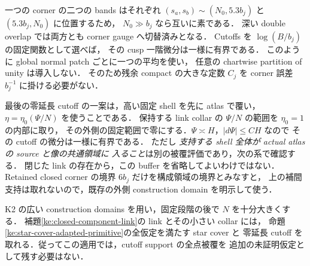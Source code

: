 一つの corner の二つの bands はそれぞれ
$(s_a,s_b)\sim(N_0,5.3b_j)$ と $(5.3b_j,N_0)$ に位置するため，
$N_0\gg b_j$ なら互いに素である．
深い double overlap では両方とも corner gauge へ切替済みとなる．
Cutoffs を $\log(B/b_j)$ の固定関数として選べば，
その cusp 一階微分は一様に有界である．
このように global normal patch ごとに一つの平均を使い，
任意の chartwise partition of unity は導入しない．
そのため残余 compact の大きな定数 $C_j$ を corner 誤差 $b_j^{-1}$ に掛ける必要がない．

最後の零延長 cutoff の一案は，高い固定 shell を先に atlas で覆い，
$\eta=\eta_0(\Psi/N)$ を使うことである．
保持する link collar の $\Psi/N$ の範囲を $\eta_0=1$ の内部に取り，
その外側の固定範囲で零にする．$\Psi\asymp H$，$|d\Psi|\le CH$ なので
その cutoff の微分は一様に有界である．
ただし \emph{支持する shell 全体が actual atlas の source と像の共通領域に
入ること}は別の被覆評価であり，次の系で確認する．
閉じた link の存在から，この buffer を省略してよいわけではない．
Retained closed corner の境界 $6b_j$ だけを構成領域の境界とみなすと，
上の補間支持は取れないので，既存の外側 construction domain を明示して使う．

\begin{corollary}
\label{ke:component-shell-primitive-support}
K2 の広い construction domains を用い，固定段階の後で $N$ を十分大きくする．
補題\ref{ke:closed-component-link}の link とその小さい collar には，
命題\ref{ke:star-cover-adapted-primitive}の全仮定を満たす star cover と
零延長 cutoff を取れる．従ってこの適用では，cutoff support の全点被覆を
追加の未証明仮定として残す必要はない．
\end{corollary}

